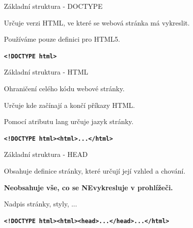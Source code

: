 \documentclass[aspectratio=1610]{beamer}
\begin{document}
\begin{frame}{Základní struktura - DOCTYPE}
    \begin{cardTiny}
        \begin{flushleft}
            Určuje verzi HTML, ve které se webová stránka má vykreslit.

            Používáme pouze definici pro HTML5.
        \end{flushleft}
    \end{cardTiny}
    \begin{cardTiny}
        \begin{flushleft}
        \texttt{\textbf{<!DOCTYPE html>}}
        \end{flushleft}
    \end{cardTiny}
\end{frame}

\begin{frame}{Základní struktura - HTML}
    \begin{cardTiny}
        \begin{flushleft}
            Ohraničení celého kódu webové stránky.

            Určuje kde začínají a končí příkazy HTML.
        
            Pomocí atributu lang určuje jazyk stránky.
        \end{flushleft}
    \end{cardTiny}
    \begin{cardTiny}
        \begin{flushleft}
        \texttt{\textbf{<!DOCTYPE html><html>...</html>}}
        \end{flushleft}
    \end{cardTiny}
\end{frame}

\begin{frame}{Základní struktura - HEAD}
    \begin{cardTiny}
        \begin{flushleft}
            Obsahuje definice stránky, které určují její vzhled a chování.

            \textbf{Neobsahuje vše, co se NEvykresluje v prohlížeči.}

            Nadpis stránky, styly, ...
        \end{flushleft}
    \end{cardTiny}
    \begin{cardTiny}
        \begin{flushleft}
        \texttt{\textbf{<!DOCTYPE html><html><head>...</head>...</html>}}
        \end{flushleft}
    \end{cardTiny}
\end{frame}
\end{document}
